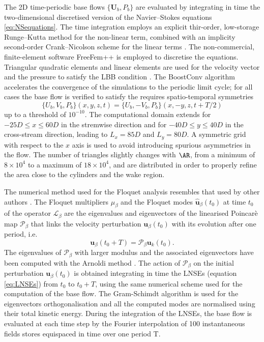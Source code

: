 The 2D time-periodic base flows $\{\bm{U}_b,P_b\}$ are evaluated by integrating in time the two-dimensional discretised version of the Navier--Stokes equations \ref{eq:NSequations}. The time integration employs an explicit thir-order, low-storage Runge--Kutta method for the non-linear term, combined with an implicity second-order Crank--Nicolson scheme for the linear terms \cite{rai-moin-1991}. The non-commercial, finite-element software FreeFem++ is employed to discretise the equations. Triangular quadratic elements and linear elements are used for the velocity vector and the pressure to satisfy the LBB condition \citep{brezzi-1974}. The BoostConv algorithm \citep{citro-etal-2017} accelerates the convergence of the simulations to the periodic limit cycle; for all cases the base flow is verified to satisfy the requires spatio-temporal symmetries 
\begin{equation}
\{U_b,V_b,P_b\}(x,y,z,t) = \{U_b,-V_b,P_b\}(x,-y,z,t+T/2)
\end{equation}
up to a threshold of $10^{-10}$. The computational domain extends for $-25 D\le x \le 60 D$ in the stremwise direction and for $-40 D \le y \le 40 D $ in the cross-stream direction, leading to $L_x=85D$ and $L_y=80D$. A symmetric grid with respect to the $x$ axis is used to avoid introducing spurious asymmetries in the flow. The number of triangles slightly changes with $\AR$, from a minimum of $8 \times 10^4$ to a maximum of $18 \times 10^4$, and are distributed in order to properly refine the area close to the cylinders and the wake region.

The numerical method used for the Floquet analysis resembles that used by other authors \citep[see for example][]{barkley-henderson-1996}. The Floquet multipliers $\mu_\beta$ and the Floquet modes $\hat{\bm{u}}_\beta(t_0)$ at time $t_0$ of the operator $\mathcal{L}_\beta$ are the eigenvalues and eigenvectors of the linearised Poincarè map $\mathcal{P}_\beta$ that links the velocity perturbation $\bm{u}_\beta(t_0)$ with its evolution after one period, i.e.
%
\begin{equation}
\bm{u}_\beta(t_0+T) = \mathcal{P}_\beta \bm{u}_k(t_0).
\end{equation}
%
The eigenvalues of $\mathcal{P}_\beta$ with larger modulus and the associated eigenvectors have been computed with the Arnoldi method \citep{saad-2011}. The action of $\mathcal{P}_\beta$ on the initial perturbation $\bm{u}_\beta(t_0)$ is obtained integrating in time the LNSEs (equation \ref{eq:LNSEs}) from $t_0$ to $t_0+T$, using the same numerical scheme used for the computation of the base flow. The Gram-Schimdt algorithm is used for the eigenvectors orthogonalisation and all the computed modes are normalised using their total kinetic energy. During the integration of the LNSEs, the base flow is evaluated at each time step by the Fourier interpolation of 100 instantaneous fields stores equispaced in time over one period T.

